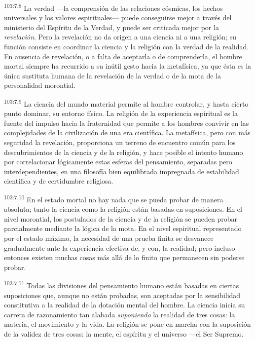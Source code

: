 \par
\textsuperscript{103:7.8} La verdad ---la comprensión de las relaciones cósmicas, los hechos universales y los valores espirituales--- puede conseguirse mejor a través del ministerio del Espíritu de la Verdad, y puede ser criticada mejor por la \textit{revelación}. Pero la revelación no da origen a una ciencia ni a una religión; su función consiste en coordinar la ciencia y la religión con la verdad de la realidad. En ausencia de revelación, o a falta de aceptarla o de comprenderla, el hombre mortal siempre ha recurrido a su inútil gesto hacia la metafísica, ya que ésta es la única sustituta humana de la revelación de la verdad o de la mota de la personalidad morontial.

\par
\textsuperscript{103:7.9} La ciencia del mundo material permite al hombre controlar, y hasta cierto punto dominar, su entorno físico. La religión de la experiencia espiritual es la fuente del impulso hacia la fraternidad que permite a los hombres convivir en las complejidades de la civilización de una era científica. La metafísica, pero con más seguridad la revelación, proporciona un terreno de encuentro común para los descubrimientos de la ciencia y de la religión, y hace posible el intento humano por correlacionar lógicamente estas esferas del pensamiento, separadas pero interdependientes, en una filosofía bien equilibrada impregnada de estabilidad científica y de certidumbre religiosa.

\par
\textsuperscript{103:7.10} En el estado mortal no hay nada que se pueda probar de manera absoluta; tanto la ciencia como la religión están basadas en suposiciones. En el nivel morontial, los postulados de la ciencia y de la religión se pueden probar parcialmente mediante la lógica de la mota. En el nivel espiritual representado por el estado máximo, la necesidad de una prueba finita se desvanece gradualmente ante la experiencia efectiva de, y con, la realidad; pero incluso entonces existen muchas cosas más allá de lo finito que permanecen sin poderse probar.

\par
\textsuperscript{103:7.11} Todas las divisiones del pensamiento humano están basadas en ciertas suposiciones que, aunque no están probadas, son aceptadas por la sensibilidad constitutiva a la realidad de la dotación mental del hombre. La ciencia inicia su carrera de razonamiento tan alabada \textit{suponiendo} la realidad de tres cosas: la materia, el movimiento y la vida. La religión se pone en marcha con la suposición de la validez de tres cosas: la mente, el espíritu y el universo ---el Ser Supremo.


